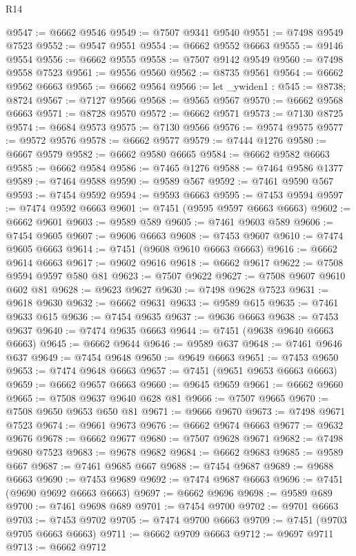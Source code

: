 \begin{lexlean}{R14}
\begin{coremodule}
{{{{{{{{{{{{{{{{{{{{{{{{{{{{{{{{{{{{{{{{{{{{{{{{{{{{{{{{{{{{{{{{{{{{{{{{{{{{{{{{{{@9547 := @6662 @9546
@9549 := @7507 @9341 @9540
@9551 := @7498 @9549 @7523
@9552 := @9547 @9551
@9554 := @6662 @9552 @6663
@9555 := @9146 @9554
@9556 := @6662 @9555
@9558 := @7507 @9142 @9549
@9560 := @7498 @9558 @7523
@9561 := @9556 @9560
@9562 := @8735 @9561
@9564 := @6662 @9562 @6663
@9565 := @6662 @9564
@9566 := let _ywiden1 : @545 := @8738; @8724
@9567 := @7127 @9566
@9568 := @9565 @9567
@9570 := @6662 @9568 @6663
@9571 := @8728 @9570
@9572 := @6662 @9571
@9573 := @7130 @8725
@9574 := @6684 @9573
@9575 := @7130 @9566
@9576 := @9574 @9575
@9577 := @9572 @9576
@9578 := @6662 @9577
@9579 := @7444 @1276
@9580 := @6667 @9579
@9582 := @6662 @9580 @6665
@9584 := @6662 @9582 @6663
@9585 := @6662 @9584
@9586 := @7465 @1276
@9588 := @7464 @9586 @1377
@9589 := @7464 @9588
@9590 := @9589 @567
@9592 := @7461 @9590 @567
@9593 := @7454 @9592
@9594 := @9593 @6663
@9595 := @7453 @9594
@9597 := @7474 @9592 @6663
@9601 := @7451 (@9595 @9597 @6663 @6663)
@9602 := @6662 @9601
@9603 := @9589 @589
@9605 := @7461 @9603 @589
@9606 := @7454 @9605
@9607 := @9606 @6663
@9608 := @7453 @9607
@9610 := @7474 @9605 @6663
@9614 := @7451 (@9608 @9610 @6663 @6663)
@9616 := @6662 @9614 @6663
@9617 := @9602 @9616
@9618 := @6662 @9617
@9622 := @7508 @9594 @9597 @580 @81
@9623 := @7507 @9622
@9627 := @7508 @9607 @9610 @602 @81
@9628 := @9623 @9627
@9630 := @7498 @9628 @7523
@9631 := @9618 @9630
@9632 := @6662 @9631
@9633 := @9589 @615
@9635 := @7461 @9633 @615
@9636 := @7454 @9635
@9637 := @9636 @6663
@9638 := @7453 @9637
@9640 := @7474 @9635 @6663
@9644 := @7451 (@9638 @9640 @6663 @6663)
@9645 := @6662 @9644
@9646 := @9589 @637
@9648 := @7461 @9646 @637
@9649 := @7454 @9648
@9650 := @9649 @6663
@9651 := @7453 @9650
@9653 := @7474 @9648 @6663
@9657 := @7451 (@9651 @9653 @6663 @6663)
@9659 := @6662 @9657 @6663
@9660 := @9645 @9659
@9661 := @6662 @9660
@9665 := @7508 @9637 @9640 @628 @81
@9666 := @7507 @9665
@9670 := @7508 @9650 @9653 @650 @81
@9671 := @9666 @9670
@9673 := @7498 @9671 @7523
@9674 := @9661 @9673
@9676 := @6662 @9674 @6663
@9677 := @9632 @9676
@9678 := @6662 @9677
@9680 := @7507 @9628 @9671
@9682 := @7498 @9680 @7523
@9683 := @9678 @9682
@9684 := @6662 @9683
@9685 := @9589 @667
@9687 := @7461 @9685 @667
@9688 := @7454 @9687
@9689 := @9688 @6663
@9690 := @7453 @9689
@9692 := @7474 @9687 @6663
@9696 := @7451 (@9690 @9692 @6663 @6663)
@9697 := @6662 @9696
@9698 := @9589 @689
@9700 := @7461 @9698 @689
@9701 := @7454 @9700
@9702 := @9701 @6663
@9703 := @7453 @9702
@9705 := @7474 @9700 @6663
@9709 := @7451 (@9703 @9705 @6663 @6663)
@9711 := @6662 @9709 @6663
@9712 := @9697 @9711
@9713 := @6662 @9712
}}}}}}}}}}}}}}}}}}}}}}}}}}}}}}}}}}}}}}}}}}}}}}}}}}}}}}}}}}}}}}}}}}}}}}}}}}}}}}}}}}
\end{coremodule}
\end{lexlean}

